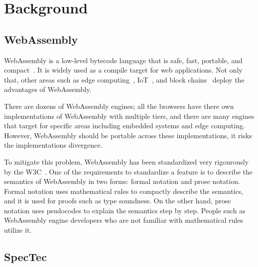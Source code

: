 
\chapter{Background}
\label{ch:background}
\noindent


\section{WebAssembly}

WebAssembly is a low-level bytecode language that is safe, fast, portable, and
compact~\cite{wasm}.
It is widely used as a compile target for web applications.
Not only that, other areas such as edge computing~\cite{wasm-edge},
IoT~\cite{wasm-iot}, and block chains~\cite{wasm-block} deploy the advantages
of WebAssembly.

There are dozens of WebAssembly engines; all the browsers have there own
implementations of WebAssembly with multiple tiers, and there are many engines
that target for specific areas including embedded systems and edge computing.
However, WebAssembly should be portable across these implementations, it risks
the implementations divergence.

To mitigate this problem, WebAssembly has been standardized very rigourously by
the W3C~\cite{wasm-w3c}.
One of the requirements to standardize a feature is to describe the semantics
of WebAssembly in two forms: formal notation and prose notation.
Formal notation uses mathematical rules to compactly describe the semantics,
and it is used for proofs such as type soundness.
On the other hand, prose notation uses psudocodes to explain the semantics
step by step.
People such as WebAssembly engine developers who are not familiar with
mathematical rules utilize it.





\section{SpecTec}
